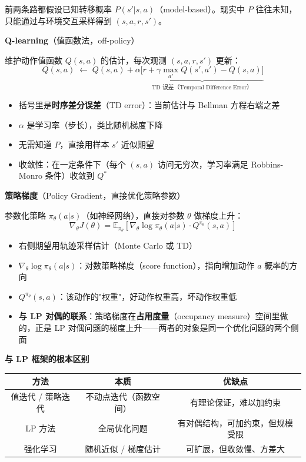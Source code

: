 \documentclass[12pt, a4paper]{ctexart}
\begin{document}
\begin{blackboard}

前两条路都假设已知转移概率 $P(s'|s,a)$（model-based）。现实中 $P$ 往往未知，只能通过与环境交互采样得到 $(s, a, r, s')$。

\textbf{Q-learning}（值函数法，off-policy）

维护动作值函数 $Q(s,a)$ 的估计，每次观测 $(s, a, r, s')$ 更新：
\[
Q(s,a) \;\leftarrow\; Q(s,a) + \alpha \underbrace{\bigl[r + \gamma \max_{a'} Q(s',a') - Q(s,a)\bigr]}_{\text{TD 误差（Temporal Difference Error）}}
\]

\begin{itemize}
    \item 括号里是\textbf{时序差分误差}（TD error）：当前估计与 Bellman 方程右端之差
    \item $\alpha$ 是学习率（步长），类比随机梯度下降
    \item 无需知道 $P$，直接用样本 $s'$ 近似期望
    \item 收敛性：在一定条件下（每个 $(s,a)$ 访问无穷次，学习率满足 Robbins-Monro 条件）收敛到 $Q^*$
\end{itemize}

\textbf{策略梯度}（Policy Gradient，直接优化策略参数）

参数化策略 $\pi_\theta(a|s)$（如神经网络），直接对参数 $\theta$ 做梯度上升：
\[
\nabla_\theta J(\theta) = \mathbb{E}_{\pi_\theta} \left[ \nabla_\theta \log \pi_\theta(a|s) \cdot Q^{\pi_\theta}(s,a) \right]
\]

\begin{itemize}
    \item 右侧期望用轨迹采样估计（Monte Carlo 或 TD）
    \item $\nabla_\theta \log \pi_\theta(a|s)$：对数策略梯度（score function），指向增加动作 $a$ 概率的方向
    \item $Q^{\pi_\theta}(s,a)$：该动作的"权重"，好动作权重高，坏动作权重低
    \item \textbf{与 LP 对偶的联系}：策略梯度在\textbf{占用度量}（occupancy measure）空间里做的，正是 LP 对偶问题的梯度上升——两者的对象是同一个优化问题的两个侧面
\end{itemize}

\textbf{与 LP 框架的根本区别}

\begin{center}
\begin{tabular}{c|c|c}
方法 & 本质 & 优缺点 \\
\hline
值迭代 / 策略迭代 & 不动点迭代（函数空间） & 有理论保证，难以加约束 \\
LP 方法 & 全局优化问题 & 有对偶结构，可加约束，但规模受限 \\
强化学习 & 随机近似 / 梯度估计 & 可扩展，但收敛慢、方差大
\end{tabular}
\end{center}


\end{blackboard}
\end{document}
